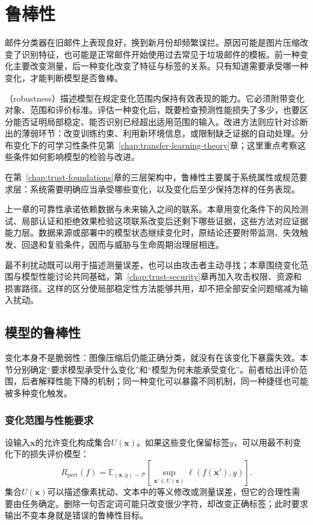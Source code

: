 \chapter{鲁棒性}
\label{chap:trust-robustness}

邮件分类器在旧邮件上表现良好，换到新月份却频繁误拦。原因可能是图片压缩改变了识别特征，也可能是正常邮件开始使用过去常见于垃圾邮件的模板。前一种变化主要改变测量，后一种变化改变了特征与标签的关系。只有知道需要承受哪一种变化，才能判断模型是否鲁棒。

（robustness）描述模型在规定变化范围内保持有效表现的能力。它必须附带变化对象、范围和评价标准。评估一种变化后，既要检查预测性能损失了多少，也要区分能否证明局部稳定、能否识别已经超出适用范围的输入。改进方法则应针对诊断出的薄弱环节：改变训练约束、利用新环境信息，或限制缺乏证据的自动处理。分布变化下的可学习性条件见第~\ref{chap:transfer-learning-theory}章；这里重点考察这些条件如何影响模型的检验与改进。

在第~\ref{chap:trust-foundations}章的三层架构中，鲁棒性主要属于系统属性或规范要求层：系统需要明确应当承受哪些变化，以及变化后至少保持怎样的任务表现。

上一章的可靠性承诺依赖数据与未来输入之间的联系。本章用变化条件下的风险测试、局部认证和拒绝效果检验这项联系改变后还剩下哪些证据，这些方法对应证据能力层。数据来源或部署中的模型状态继续变化时，原结论还要附带监测、失效触发、回退和复验条件，因而与威胁与生命周期治理层相连。

最不利扰动既可以用于描述测量误差，也可以由攻击者主动寻找；本章围绕变化范围与模型性能讨论共同基础，第~\ref{chap:trust-security}章再加入攻击权限、资源和损害路径。这样的区分使局部稳定性方法能够共用，却不把全部安全问题缩减为输入扰动。

\section{模型的鲁棒性}
\label{sec:robustness-fragility}

变化本身不是脆弱性：图像压缩后仍能正确分类，就没有在该变化下暴露失效。本节分别确定“要求模型承受什么变化”和“模型为何未能承受变化”。前者给出评价范围，后者解释性能下降的机制；同一种变化可以暴露不同机制，同一种捷径也可能被多种变化触发。

\subsection{变化范围与性能要求}
\label{sec:robustness-change-scope}

设输入$\bm{x}$的允许变化构成集合$U(\bm{x})$。如果这些变化保留标签$y$，可以用最不利变化下的损失评价模型：
\begin{equation}
 R_{\mathrm{pert}}(f)
 =\mathbb E_{(\bm{x},y)\sim\mathcal P}
   \left[\sup_{\bm{x}'\in U(\bm{x})}
   \ell(f(\bm{x}'),y)\right].
 \label{eq:robustness-perturbation-risk}
\end{equation}
集合$U(\bm{x})$可以描述像素扰动、文本中的等义修改或测量误差，但它的合理性需要由任务确定。删除一句否定词可能只改变很少字符，却改变正确标签；此时要求输出不变本身就是错误的鲁棒性目标。


